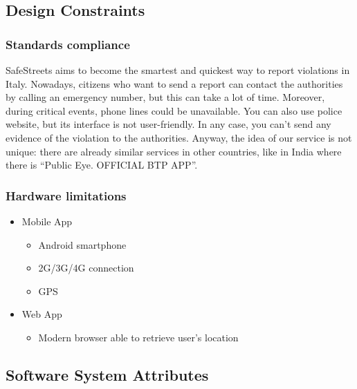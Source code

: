 \subsection{Design Constraints}
\subsubsection{Standards compliance }
SafeStreets aims to become the smartest and quickest way to report violations in Italy. 
Nowadays, citizens who want to send a report can contact the authorities by calling an emergency number, 
but this can take a lot of time. Moreover, during critical events, phone lines could be unavailable. 
You can also use police website, but its interface is not user-friendly. In any case, you can’t send any 
evidence of the violation to the authorities. Anyway, the idea of our service is not unique: there are already 
similar services in other countries, like in India where there is “Public Eye. OFFICIAL BTP APP”.
\subsubsection{Hardware limitations}
\begin{itemize}
\item Mobile App
\begin{itemize}
\item Android smartphone
\item 2G/3G/4G connection
\item GPS
\end{itemize}
\item Web App
\begin{itemize}
\item Modern browser able to retrieve user's location
\end{itemize}
\end{itemize}
\subsection{Software System Attributes}

